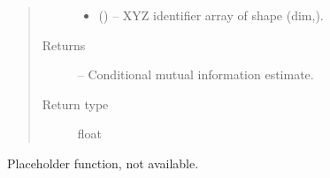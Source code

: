 \documentclass[letterpaper,10pt,english]{sphinxmanual}
\begin{document}
\begin{fulllineitems}
\begin{fulllineitems}
\begin{quote}
\begin{description}
\begin{itemize}
\item {} 
 () -- XYZ identifier array of shape (dim,).

\end{itemize}

\item[{Returns}] \leavevmode
{} -- Conditional mutual information estimate.

\item[{Return type}] \leavevmode
float

\end{description}\end{quote}

\end{fulllineitems}


\begin{fulllineitems}
\label{\detokenize{index:tigramite.independence_tests.CMIknn.get_model_selection_criterion}}
Placeholder function, not available.

\end{fulllineitems}


\end{fulllineitems}

\end{document}
